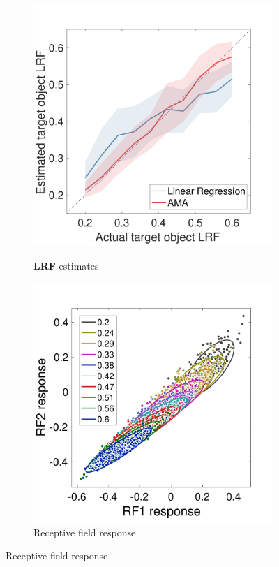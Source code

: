 \documentclass{jov}
\providecommand{\DIFaddtex}[1]{{\bf #1}} %
\providecommand{\DIFdeltex}[1]{} %
\providecommand{\DIFaddFL}[1]{\DIFadd{#1}} %
\providecommand{\DIFdelFL}[1]{\DIFdel{#1}} %
\providecommand{\DIFaddbeginFL}{} %
\providecommand{\DIFaddendFL}{} %
\providecommand{\DIFdelbeginFL}{} %
\providecommand{\DIFdelendFL}{} %
\providecommand{\DIFadd}[1]{\texorpdfstring{\DIFaddtex{#1}}{#1}} %
\providecommand{\DIFdel}[1]{\texorpdfstring{\DIFdeltex{#1}}{}} %
\newcommand{\DIFscaledelfig}{0.5}
\newlength{\DIFdelgraphicswidth} %
\newlength{\DIFdelgraphicsheight} %
\newcommand{\DIFaddincludegraphics}[2][]{{\color{blue}\fbox{\DIFOincludegraphics[#1]{#2}}}} %
\newcommand{\DIFdelincludegraphics}[2][]{%
\sbox{\DIFdelgraphicsbox}{\DIFOincludegraphics[#1]{#2}}%
\settoboxwidth{\DIFdelgraphicswidth}{\DIFdelgraphicsbox} %
\settoboxtotalheight{\DIFdelgraphicsheight}{\DIFdelgraphicsbox} %
\scalebox{\DIFscaledelfig}{%
\parbox[b]{\DIFdelgraphicswidth}{\usebox{\DIFdelgraphicsbox}\\[-\baselineskip] \rule{\DIFdelgraphicswidth}{0em}}\llap{\resizebox{\DIFdelgraphicswidth}{\DIFdelgraphicsheight}{%
\setlength{\unitlength}{\DIFdelgraphicswidth}%
\begin{picture}(1,1)%
\thicklines\linethickness{2pt} %
{\color[rgb]{1,0,0}\put(0,0){\framebox(1,1){}}}%
{\color[rgb]{1,0,0}\put(0,0){\line( 1,1){1}}}%
{\color[rgb]{1,0,0}\put(0,1){\line(1,-1){1}}}%
\end{picture}%
}\hspace*{3pt}}} %
} %
\DeclareRobustCommand{\DIFaddbeginFL}{\DIFOaddbeginFL \let\includegraphics\DIFaddincludegraphics} %
\DeclareRobustCommand{\DIFaddendFL}{\DIFOaddendFL \let\includegraphics\DIFOincludegraphics} %
\DeclareRobustCommand{\DIFdelbeginFL}{\DIFOdelbeginFL \let\includegraphics\DIFdelincludegraphics} %
\DeclareRobustCommand{\DIFdelendFL}{\DIFOaddendFL \let\includegraphics\DIFOincludegraphics} %
\begin{document}
\begin{figure}
\centering
            \begin{subfigure}[b]{0.3 \textwidth}
        \caption{\DIFdelbeginFL \DIFdelFL{LRV }\DIFdelendFL \DIFaddbeginFL \DIFaddFL{LRF }\DIFaddendFL estimates}
        \includegraphics[width=\textwidth, trim={0 0 0 1.3cm},clip]{../FiguresDraft5/Figure12/Figure12_a.pdf}
        \label{fig:case3Estimates}
    \end{subfigure} 
        \begin{subfigure}[b]{0.31\textwidth}
        \caption{Receptive field response}
        \includegraphics[width=\textwidth, trim={0 3mm 0 15mm},clip]{../FiguresDraft5/Figure12/Figure12_b.pdf}

\end{subfigure}
\end{figure}
\end{document}
